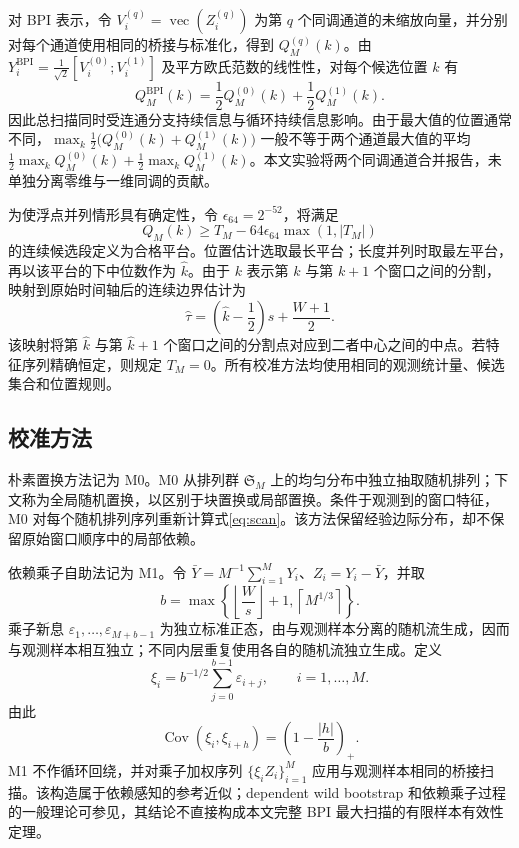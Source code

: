 对 BPI 表示，令 $V_i^{(q)}=\operatorname{vec}(Z_i^{(q)})$ 为第 $q$ 个同调通道的未缩放向量，并分别对每个通道使用相同的桥接与标准化，得到 $Q_M^{(q)}(k)$。由 $Y_i^{\mathrm{BPI}}=\frac1{\sqrt2}[V_i^{(0)};V_i^{(1)}]$ 及平方欧氏范数的线性性，对每个候选位置 $k$ 有
\[
 Q_M^{\mathrm{BPI}}(k)=\frac12 Q_M^{(0)}(k)+\frac12 Q_M^{(1)}(k).
\]
因此总扫描同时受连通分支持续信息与循环持续信息影响。由于最大值的位置通常不同，$\max_k\tfrac12\bigl(Q_M^{(0)}(k)+Q_M^{(1)}(k)\bigr)$ 一般不等于两个通道最大值的平均 $\tfrac12\max_k Q_M^{(0)}(k)+\tfrac12\max_k Q_M^{(1)}(k)$。本文实验将两个同调通道合并报告，未单独分离零维与一维同调的贡献。

为使浮点并列情形具有确定性，令 $\epsilon_{64}=2^{-52}$，将满足
\[
 Q_M(k)\ge T_M-64\epsilon_{64}\max(1,|T_M|)
\]
的连续候选段定义为合格平台。位置估计选取最长平台；长度并列时取最左平台，再以该平台的下中位数作为 $\widehat k$。由于 $k$ 表示第 $k$ 与第 $k+1$ 个窗口之间的分割，映射到原始时间轴后的连续边界估计为
\begin{equation}\label{eq:location-map}
 \widehat\tau=\left(\widehat k-\frac12\right)s+\frac{W+1}{2}.
\end{equation}
该映射将第 $\widehat k$ 与第 $\widehat k+1$ 个窗口之间的分割点对应到二者中心之间的中点。若特征序列精确恒定，则规定 $T_M=0$。所有校准方法均使用相同的观测统计量、候选集合和位置规则。

\subsection{校准方法}\label{sec:calibration}

朴素置换方法记为 M0。M0 从排列群 $\mathfrak S_M$ 上的均匀分布中独立抽取随机排列；下文称为全局随机置换，以区别于块置换或局部置换。条件于观测到的窗口特征，M0 对每个随机排列序列重新计算式\eqref{eq:scan}。该方法保留经验边际分布，却不保留原始窗口顺序中的局部依赖。

依赖乘子自助法记为 M1。令 $\bar Y=M^{-1}\sum_{i=1}^M Y_i$、$Z_i=Y_i-\bar Y$，并取
\begin{equation}\label{eq:dmb-bandwidth}
 b=\max\left\{\left\lfloor\frac Ws\right\rfloor+1,
                 \left\lceil M^{1/3}\right\rceil\right\}.
\end{equation}
乘子新息 $\varepsilon_1,\ldots,\varepsilon_{M+b-1}$ 为独立标准正态，由与观测样本分离的随机流生成，因而与观测样本相互独立；不同内层重复使用各自的随机流独立生成。定义
\begin{equation}\label{eq:dmb-multiplier}
 \xi_i=b^{-1/2}\sum_{j=0}^{b-1}\varepsilon_{i+j},
 \qquad i=1,\ldots,M.
\end{equation}
由此
\begin{equation}\label{eq:dmb-cov}
 \operatorname{Cov}(\xi_i,\xi_{i+h})
 =\left(1-\frac{|h|}{b}\right)_+.
\end{equation}
M1 不作循环回绕，并对乘子加权序列 $\{\xi_iZ_i\}_{i=1}^M$ 应用与观测样本相同的桥接扫描。该构造属于依赖感知的参考近似；dependent wild bootstrap 和依赖乘子过程的一般理论可参见\cite{Shao2010,BucherKojadinovic2016}，其结论不直接构成本文完整 BPI 最大扫描的有限样本有效性定理。

